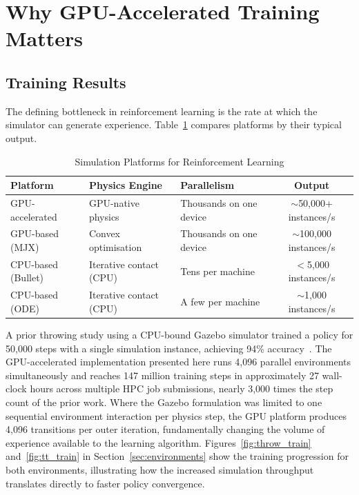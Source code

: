 \documentclass[11pt, a4paper]{article}
\begin{document}
\section{Why GPU-Accelerated Training Matters}
\label{sec:advantage}

\subsection{Training Results}

The defining bottleneck in reinforcement learning is the rate at which the simulator can generate experience. Table~\ref{tab:sim_comparison} compares platforms by their typical output.

\begin{table}[H]
\centering
\caption{Simulation Platforms for Reinforcement Learning}
\label{tab:sim_comparison}
\begin{tabularx}{\textwidth}{@{} l l l c @{}}
\toprule
\textbf{Platform} & \textbf{Physics Engine} & \textbf{Parallelism} & \textbf{Output} \\
\midrule
GPU-accelerated & GPU-native physics & Thousands on one device & $\sim$50,000+ instances/s \\
GPU-based (MJX) & Convex optimisation & Thousands on one device & $\sim$100,000 instances/s \\
CPU-based (Bullet) & Iterative contact (CPU) & Tens per machine & $<$5,000 instances/s \\
CPU-based (ODE) & Iterative contact (CPU) & A few per machine & $\sim$1,000 instances/s \\
\bottomrule
\end{tabularx}
\end{table}

A prior throwing study using a CPU-bound Gazebo simulator trained a policy for 50,000 steps with a single simulation instance, achieving 94\% accuracy~\cite{kasaei2023learning}. The GPU-accelerated implementation presented here runs 4,096 parallel environments simultaneously and reaches 147 million training steps in approximately 27 wall-clock hours across multiple HPC job submissions, nearly 3,000 times the step count of the prior work. Where the Gazebo formulation was limited to one sequential environment interaction per physics step, the GPU platform produces 4,096 transitions per outer iteration, fundamentally changing the volume of experience available to the learning algorithm. Figures~\ref{fig:throw_train} and~\ref{fig:tt_train} in Section~\ref{sec:environments} show the training progression for both environments, illustrating how the increased simulation throughput translates directly to faster policy convergence.
\end{document}
